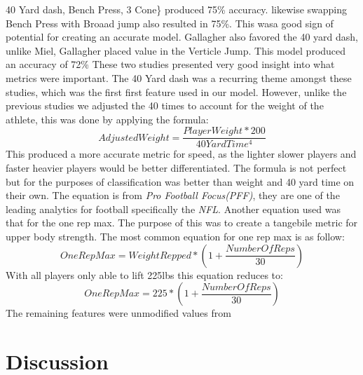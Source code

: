 \documentclass[confrence]{IEEEtran}
\begin{document}
40 Yard dash, Bench Press, 3 Cone\} produced 75\% accuracy. likewise swapping Bench Press with Broaad jump also resulted in 75\%.
This wasa good sign of potential for creating an accurate model. 
Gallagher also favored the 40 yard dash, unlike Miel, Gallagher placed value in the Verticle Jump. This model produced an accuracy of 72\%
These two studies presented very good insight into what metrics were important. 
The 40 Yard dash was a recurring theme amongst these studies, which was the first first feature used in our model.
However, unlike the previous studies we adjusted the 40 times to account for the weight of the athlete, this was done by applying the formula: 
\[
    AdjustedWeight = \frac{PlayerWeight*200}{40YardTime^4}
\]
This produced a more accurate metric for speed, as the lighter slower players and faster heavier players would be better differentiated.
The formula is not perfect but for the purposes of classification was better than weight and 40 yard time on their own. 
The equation is from \textit{Pro Football Focus(PFF)}, they are one of the leading analytics for football specifically the \textit{NFL}.
Another equation used was that for the one rep max. The purpose of this was to create a tangebile metric for upper body strength. 
The most common equation for one rep max is as follow:
\[
    OneRepMax = WeightRepped*(1+\frac{NumberOfReps}{30})
\]
With all players only able to lift 225lbs this equation reduces to:
\[
    OneRepMax = 225*(1+\frac{NumberOfReps}{30})
\]
The remaining features were unmodified values from 
\\
\section*{Discussion}
\\
\end{document}
